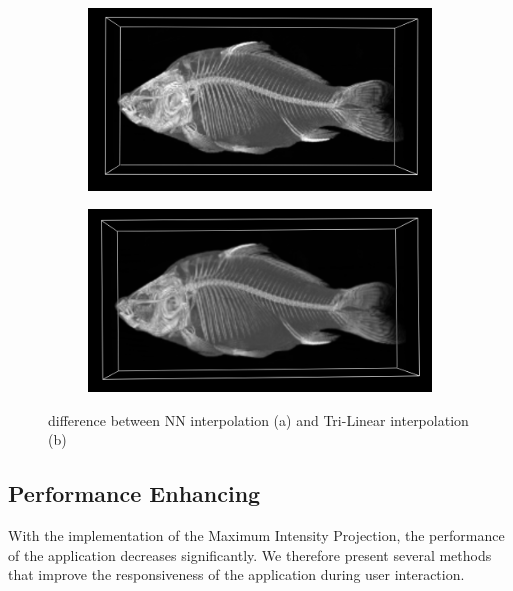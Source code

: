 \newpage

\begin{figure}[h!]
    \centering
    \captionsetup{justification=centering,margin=0.5cm}
    \begin{subfigure}[t]{0.48\textwidth}
        \includegraphics[width=\textwidth]{img/fish_NN.png}
        \caption{ }
    \end{subfigure}
    \begin{subfigure}[t]{0.48\textwidth}
        \includegraphics[width=\textwidth]{img/fish_TriLin.png}
        \caption{ }
    \end{subfigure}
    \caption{difference between NN interpolation (a) and Tri-Linear interpolation (b)}
    \label{fig:trilinear1}
\end{figure}

\subsection{Performance Enhancing}\label{subsec:perf_enh}
With the implementation of the Maximum Intensity Projection, the performance of the application decreases significantly. We therefore present several methods that improve the responsiveness of the application during user interaction.

